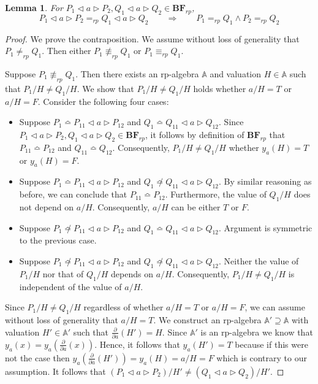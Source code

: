 \documentclass[a4paper,twoside,openright]{report}
\newcommand{\dd}[1]{\frac{\partial}{\partial #1}}
\newcommand{\BF}{\ensuremath{\textbf{BF}}}
\newcommand{\syn}{\bumpeq}
\newcommand{\nsyn}{\not\bumpeq}
\newcommand{\lef}{\ensuremath{\triangleleft}}
\newcommand{\rig}{\ensuremath{\triangleright}}
\newtheorem{lem}[theorem]{Lemma}
\begin{document}
\begin{lem}
For $P_1\lef a\rig P_2,Q_1\lef a\rig Q_2\in\BF_{rp}$,
\[
P_1\lef a\rig P_2=_{rp}Q_1\lef a\rig Q_2\qquad\Longrightarrow\qquad P_1=_{rp}Q_1\wedge P_2=_{rp}Q_2
\]
\end{lem}
\begin{proof}
We prove the contraposition. We assume without loss of generality that $P_1\ne_{rp}Q_1$. Then either $P_1\not\equiv_{rp} Q_1$ or $P_1\equiv_{rp}Q_1$.

Suppose $P_1\not\equiv_{rp}Q_1$. Then there exists an rp-algebra $\mathbb{A}$ and valuation $H\in\mathbb{A}$ such that $P_1/H\ne Q_1/H$. We show that $P_1/H\ne Q_1/H$ holds whether $a/H=T$ or $a/H=F$. Consider the following four cases:
\begin{itemize}
\item Suppose $P_1\syn P_{11}\lef a\rig P_{12}$ and $Q_1\syn Q_{11}\lef a\rig Q_{12}$. Since $P_1\lef a\rig P_2,Q_1\lef a\rig Q_2\in\BF_{rp}$, it follows by definition of $\BF_{rp}$ that $P_{11}\syn P_{12}$ and $Q_{11}\syn Q_{12}$. Consequently, $P_1/H\ne Q_1/H$ whether $y_a(H)=T$ or $y_a(H)=F$.
\item Suppose $P_1\syn P_{11}\lef a\rig P_{12}$ and $Q_1\nsyn Q_{11}\lef a\rig Q_{12}$. By similar reasoning as before, we can conclude that $P_{11}\syn P_{12}$. Furthermore, the value of $Q_1/H$ does not depend on $a/H$. Consequently, $a/H$ can be either $T$ or $F$.
\item Suppose $P_1\nsyn P_{11}\lef a\rig P_{12}$ and $Q_1\syn Q_{11}\lef a\rig Q_{12}$. Argument is symmetric to the previous case.
\item Suppose $P_1\nsyn P_{11}\lef a\rig P_{12}$ and $Q_1\nsyn Q_{11}\lef a\rig Q_{12}$. Neither the value of $P_1/H$ nor that of $Q_1/H$ depends on $a/H$. Consequently, $P_1/H\ne Q_1/H$ is independent of the value of $a/H$.
\end{itemize}
Since $P_1/H\ne Q_1/H$ regardless of whether $a/H=T$ or $a/H=F$, we can assume without loss of generality that $a/H=T$. We construct an rp-algebra $\mathbb{A}'\supseteq\mathbb{A}$ with valuation $H'\in\mathbb{A'}$ such that $\dd a(H')=H$. Since $\mathbb{A'}$ is an rp-algebra we know that $y_a(x)=y_a(\dd a(x))$. Hence, it follows that $y_a(H')=T$ because if this were not the case then $y_a(\dd a(H'))=y_a(H)=a/H=F$ which is contrary to our assumption. It follows that $(P_1\lef a\rig P_2)/H'\ne(Q_1\lef a\rig Q_2)/H'$.


\end{proof}
\end{document}
